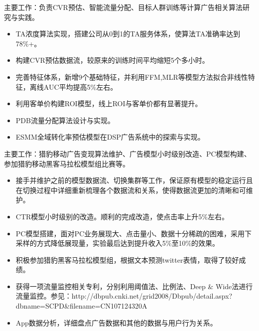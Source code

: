 \documentclass{resume}
\begin{document}
\begin{onehalfspacing}
主要工作：负责CVR预估、智能流量分配、目标人群训练等计算广告相关算法研究与实践。
\begin{itemize}
\item TA浓度算法实现，搭建公司从0到1的TA服务体系，使算法TA准确率达到78\%+。 
\item 构建CVR预估数据流，较原来的训练时间平均缩短5个多小时。
\item 完善特征体系，新增9个基础特征，并利用FFM,MLR等模型方法拟合非线性特征，离线AUC平均提高5\%左右。
\item 利用客单价构建ROI模型，线上ROI与客单价都有显著提升。
\item PDB流量分配算法设计与实现。 
\item ESMM全域转化率预估模型在DSP广告系统中的探索与实现。
\end{itemize}
\end{onehalfspacing}

\begin{onehalfspacing}
主要工作：猎豹移动广告变现算法维护、广告模型小时级别改造、PC模型构建、参加猎豹移动黑客马拉松模型组比赛等。
\begin{itemize}
  \item 接手并维护之前的模型数据流、切换集群等工作，保证原有模型的稳定运行且在切换过程中详细重新梳理各个数据流和关系，使得数据流更加的清晰和可维护。 
  \item CTR模型小时级别的改造。顺利的完成改造，使点击率上升5\%左右。
  \item PC模型搭建，面对PC业务展现大、点击量小、数据十分稀疏的困难，采用下采样的方式降低展现量，实验最后达到提升收入5\%至10\%的效果。
  \item 积极参加猎豹黑客马拉松模型组，根据文本预测twitter表情，取得了较好成绩。
  \item 获得一项流量监控相关专利，分别利用阈值法、比例法、Deep \& Wide法进行流量监控。参见：http://dbpub.cnki.net/grid2008/Dbpub/detail.aspx?dbname=SCPD\&filename=CN107124320A
  \item App数据分析，详细盘点广告数据和其他的数据与用户行为关系。      
\end{itemize}
\end{onehalfspacing}
\end{document}
